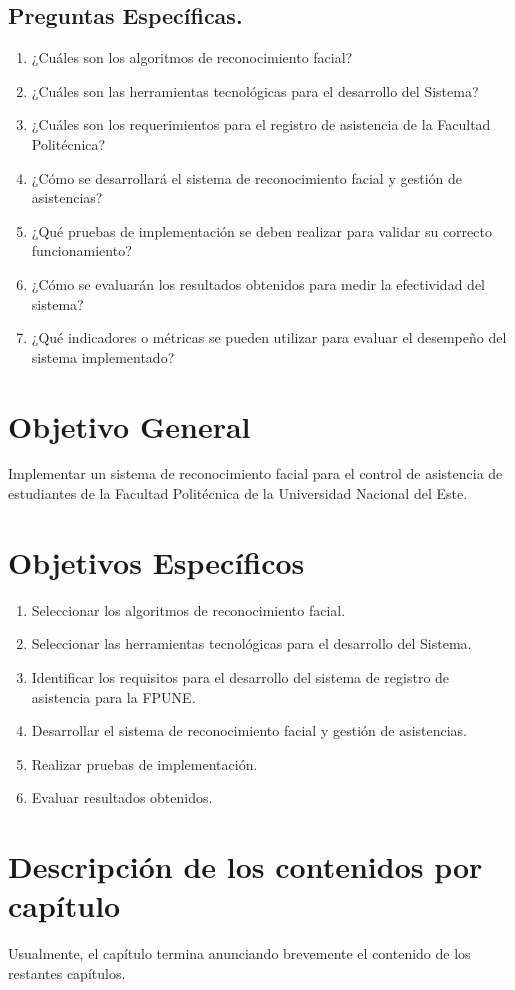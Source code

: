 \subsection{Preguntas Específicas.}
\begin{enumerate}
    \item ¿Cuáles son los algoritmos de reconocimiento facial?
    \item ¿Cuáles son las herramientas tecnológicas para el desarrollo del Sistema?
    \item ¿Cuáles son los requerimientos para el registro de asistencia de la Facultad Politécnica?
    \item ¿Cómo se desarrollará el sistema de reconocimiento facial y gestión de asistencias?
    \item ¿Qué pruebas de implementación se deben realizar para validar su correcto funcionamiento?
    \item ¿Cómo se evaluarán los resultados obtenidos para medir la efectividad del sistema?
    \item ¿Qué indicadores o métricas se pueden utilizar para evaluar el desempeño del sistema implementado?
\end{enumerate}



\section{Objetivo General}
Implementar un sistema de reconocimiento facial para el control de asistencia de estudiantes de la Facultad Politécnica de la Universidad Nacional del Este.

\section{Objetivos Específicos}
\begin{enumerate}
    \item Seleccionar los algoritmos de reconocimiento facial.
    \item Seleccionar las herramientas tecnológicas para el desarrollo del Sistema.
    \item Identificar los requisitos para el desarrollo del sistema de registro de asistencia para la FPUNE.
    \item Desarrollar el sistema de reconocimiento facial y gestión de asistencias.
    \item Realizar pruebas de implementación.
    \item Evaluar resultados obtenidos.
\end{enumerate}




\section{Descripción de los contenidos por capítulo}
Usualmente, el capítulo termina anunciando brevemente el contenido de los restantes capítulos.

